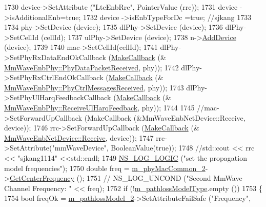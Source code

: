 \begin{DoxyCode}
1730         device->SetAttribute (\textcolor{stringliteral}{"LteEnbRrc"}, PointerValue (rrc));
1731         device ->isAdditionalEnb=\textcolor{keyword}{true};
1732         device ->isEnbTypeForDc =\textcolor{keyword}{true}; \textcolor{comment}{//sjkang}
1733 
1734         phy->SetDevice (device);
1735         dlPhy->SetDevice (device);
1736         dlPhy->SetCellId (cellId);
1737         ulPhy->SetDevice (device);
1738         n->\hyperlink{classns3_1_1Node_a42ff83ee1d5d1649c770d3f5b62375de}{AddDevice} (device);
1739 
1740         mac->SetCellId(cellId);
1741         dlPhy->SetPhyRxDataEndOkCallback (\hyperlink{group__makecallbackmemptr_ga9376283685aa99d204048d6a4b7610a4}{MakeCallback} (&
      \hyperlink{classns3_1_1MmWaveEnbPhy_a4da2f965c88f46e2ff20d17992b001ce}{MmWaveEnbPhy::PhyDataPacketReceived}, phy));
1742         dlPhy->SetPhyRxCtrlEndOkCallback (\hyperlink{group__makecallbackmemptr_ga9376283685aa99d204048d6a4b7610a4}{MakeCallback} (&
      \hyperlink{classns3_1_1MmWaveEnbPhy_ab29ddb6f1128a28601a8cc9259fedf78}{MmWaveEnbPhy::PhyCtrlMessagesReceived}, phy));
1743         dlPhy->SetPhyUlHarqFeedbackCallback (\hyperlink{group__makecallbackmemptr_ga9376283685aa99d204048d6a4b7610a4}{MakeCallback} (&
      \hyperlink{classns3_1_1MmWaveEnbPhy_af4e7efb885e564c6a2f2b82303ef098a}{MmWaveEnbPhy::ReceiveUlHarqFeedback}, phy));
1744 
1745         \textcolor{comment}{//mac->SetForwardUpCallback (MakeCallback (&MmWaveEnbNetDevice::Receive, device));}
1746         rrc->SetForwardUpCallback (\hyperlink{group__makecallbackmemptr_ga9376283685aa99d204048d6a4b7610a4}{MakeCallback} (&
      \hyperlink{classns3_1_1MmWaveNetDevice_a89410619e5b6def2634940a9ab827d38}{MmWaveEnbNetDevice::Receive}, device));
1747         rrc->SetAttribute(\textcolor{stringliteral}{"mmWaveDevice"}, BooleanValue(\textcolor{keyword}{true}));
1748         \textcolor{comment}{//std::cout << rrc << "sjkang1114" <<std::endl;}
1749         \hyperlink{group__logging_ga88acd260151caf2db9c0fc84997f45ce}{NS\_LOG\_LOGIC} (\textcolor{stringliteral}{"set the propagation model frequencies"});
1750         \textcolor{keywordtype}{double} freq = \hyperlink{classns3_1_1MmWaveHelper_ab4e9d2f9a49a485dadb3404e8c196f4c}{m\_phyMacCommon\_2}->\hyperlink{classns3_1_1MmWavePhyMacCommon_a0850d2e37c7075b9bce242723b722019}{GetCenterFrequency} ();
1751 \textcolor{comment}{//      NS\_LOG\_UNCOND ("Second MmWave Channel Frequency: " << freq);}
1752         \textcolor{keywordflow}{if} (!\hyperlink{classns3_1_1MmWaveHelper_a7f17e9bc4797b51d9a31d16c7e667960}{m\_pathlossModelType}.empty ())
1753         \{
1754                 \textcolor{keywordtype}{bool} freqOk = \hyperlink{classns3_1_1MmWaveHelper_a463070ab19ee9776262439eda4edf3e2}{m\_pathlossModel\_2}->SetAttributeFailSafe (\textcolor{stringliteral}{"Frequency"}, 

\end{DoxyCode}
